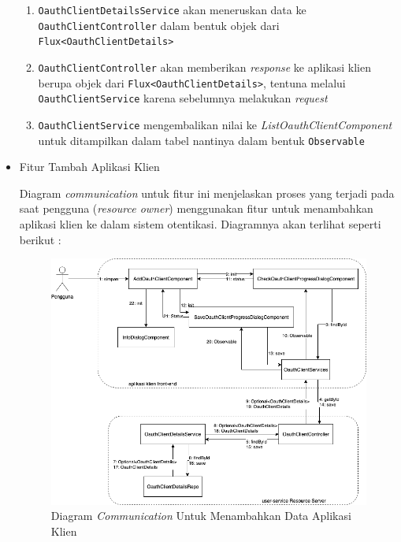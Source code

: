 \documentclass[pdftex,12pt, oneside]{article}
\begin{document}
\begin{itemize}
\begin{enumerate}
		\item \texttt{OauthClientDetailsService} akan meneruskan data ke \texttt{OauthClientController} dalam bentuk objek dari \texttt{Flux<OauthClientDetails>}
		
		\item \texttt{OauthClientController} akan memberikan \textit{response} ke aplikasi klien berupa objek dari \texttt{Flux<OauthClientDetails>}, tentuna melalui \texttt{OauthClientService} karena sebelumnya melakukan \textit{request}
		
		\item \texttt{OauthClientService} mengembalikan nilai ke \textit{ListOauthClientComponent} untuk ditampilkan dalam tabel nantinya dalam bentuk \texttt{Observable}
	\end{enumerate}
	
	\item Fitur Tambah Aplikasi Klien
	
	Diagram \textit{communication} untuk fitur ini menjelaskan proses yang terjadi pada saat pengguna (\textit{resource owner}) menggunakan fitur untuk menambahkan aplikasi klien ke dalam sistem otentikasi. Diagramnya akan terlihat seperti berikut :
	
	\begin{figure}[H]
		\centering
		\includegraphics[width=1\textwidth]{./resources/comm-dia-add-client}
		\caption{Diagram \textit{Communication} Untuk Menambahkan Data Aplikasi Klien}
		\label{fig:comm-dia-add-client}
	\end{figure}
	

\end{itemize}
\end{document}
